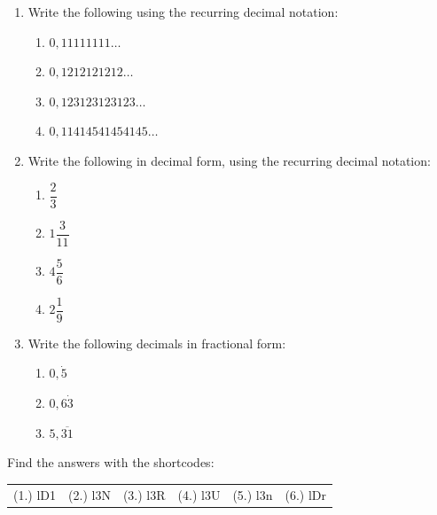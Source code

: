 \begin{exercises}{}
{\begin{enumerate}[itemsep=5pt, label=\textbf{\arabic*}. ]
% 
\item Write the following using the recurring decimal notation:
    \begin{enumerate}[itemsep=5pt, label=\textbf{(\alph*)} ] 
    \item $0,11111111\ldots$
    \item $0,1212121212\ldots$
    \item $0,123123123123\ldots$
    \item $0,11414541454145\ldots$
    \end{enumerate}
\item Write the following in decimal form, using the recurring decimal notation:
    \begin{enumerate}[itemsep=5pt, label=\textbf{(\alph*)} ] 
    \item $\dfrac{2}{3}$
    \item $1\dfrac{3}{11}$
    \item $4\dfrac{5}{6}$
    \item $2\dfrac{1}{9}$
    \end{enumerate}
\item Write the following decimals in fractional form:
    \begin{enumerate}[itemsep=5pt, label=\textbf{(\alph*)} ] 
    \item $0,\dot{5}$
    \item $0,6\dot{3}$
    \item $5,\overline{31}$
    \end{enumerate}
\end{enumerate}
\practiceinfo 
\par {} Find the answers with the shortcodes:
 \par \begin{tabular}[h]{cccccc}
 (1.) lD1  &  (2.) l3N  &  (3.) l3R  & (4.) l3U & (5.) l3n & (6.) lDr \end{tabular}
}
\end{exercises}

